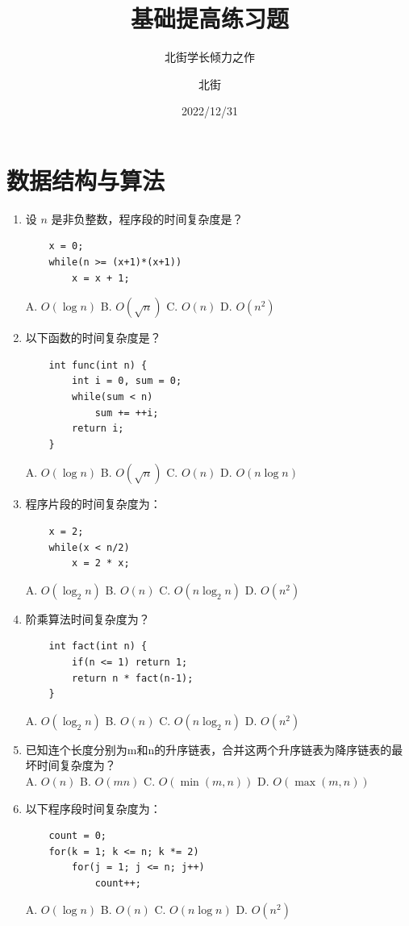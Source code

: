 \documentclass[lang=cn,newtx,10pt,scheme=chinese]{elegantbook}
\title{基础提高练习题}
\subtitle{北街学长倾力之作}
\author{北街}
\date{2022/12/31}
\begin{document}
\maketitle
\frontmatter

\tableofcontents

\mainmatter

\chapter{数据结构与算法}
\begin{enumerate}
    \item 设 $n$ 是非负整数，程序段的时间复杂度是？
    \begin{verbatim}
    x = 0;
    while(n >= (x+1)*(x+1))
        x = x + 1;
    \end{verbatim}
    A. $O(\log n)$ \quad B. $O(\sqrt{n})$ \quad C. $O(n)$ \quad D. $O(n^2)$

    \item 以下函数的时间复杂度是？
    \begin{verbatim}
    int func(int n) {
        int i = 0, sum = 0;
        while(sum < n)
            sum += ++i;
        return i;
    }
    \end{verbatim}
    A. $O(\log n)$ \quad B. $O(\sqrt{n})$ \quad C. $O(n)$ \quad D. $O(n\log n)$

    \item 程序片段的时间复杂度为：
    \begin{verbatim}
    x = 2;
    while(x < n/2)
        x = 2 * x;
    \end{verbatim}
    A. $O(\log_2 n)$ \quad B. $O(n)$ \quad C. $O(n \log_2 n)$ \quad D. $O(n^2)$

    \item 阶乘算法时间复杂度为？
    \begin{verbatim}
    int fact(int n) {
        if(n <= 1) return 1;
        return n * fact(n-1);
    }
    \end{verbatim}
    A. $O(\log_2 n)$ \quad B. $O(n)$ \quad C. $O(n \log_2 n)$ \quad D. $O(n^2)$

    \item 已知连个长度分别为m和n的升序链表，合并这两个升序链表为降序链表的最坏时间复杂度为？\\
    A. $O(n)$ \quad B. $O(mn)$ \quad C. $O(\min(m,n))$ \quad D. $O(\max(m,n))$

    \item 以下程序段时间复杂度为：
    \begin{verbatim}
    count = 0;
    for(k = 1; k <= n; k *= 2)
        for(j = 1; j <= n; j++)
            count++;
    \end{verbatim}
    A. $O(\log n)$ \quad B. $O(n)$ \quad C. $O(n \log n)$ \quad D. $O(n^2)$


\end{enumerate}
\end{document}
